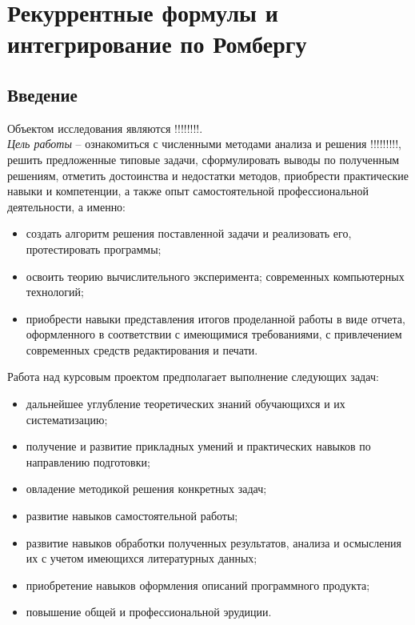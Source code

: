 \documentclass[14pt, titlepage, a4paper]{extarticle} %
\begin{document}

	\tableofcontents
	\pagebreak
	
	
	\section*{Рекуррентные формулы и интегрирование по Ромбергу}
	
	\subsection*{Введение}
	
	Объектом исследования являются !!!!!!!!.\\
	\textit{Цель работы} – ознакомиться с численными методами анализа и решения !!!!!!!!!, решить предложенные типовые задачи, сформулировать выводы по полученным решениям, отметить достоинства и недостатки методов, приобрести практические навыки и компетенции, а также опыт самостоятельной профессиональной деятельности, а именно:
	\begin{itemize}
		\item создать алгоритм решения поставленной задачи и реализовать его, протестировать программы;
		\item освоить теорию вычислительного эксперимента; современных компьютерных технологий; 
		\item приобрести навыки представления итогов проделанной работы в виде отчета, оформленного в соответствии с имеющимися требованиями, с привлечением современных средств редактирования и печати.	
	\end{itemize}
	Работа над курсовым проектом предполагает выполнение следующих задач:
	\begin{itemize}
		\item дальнейшее углубление теоретических знаний обучающихся и их систематизацию;
		\item получение и развитие прикладных умений и практических навыков по направлению подготовки;
		\item овладение методикой решения конкретных задач;
		\item развитие навыков самостоятельной работы;
		\item развитие навыков обработки полученных результатов, анализа и осмысления их с учетом имеющихся литературных данных;
		\item приобретение навыков оформления описаний программного продукта;
		\item повышение общей и профессиональной эрудиции.
	\end{itemize}
\end{document}
